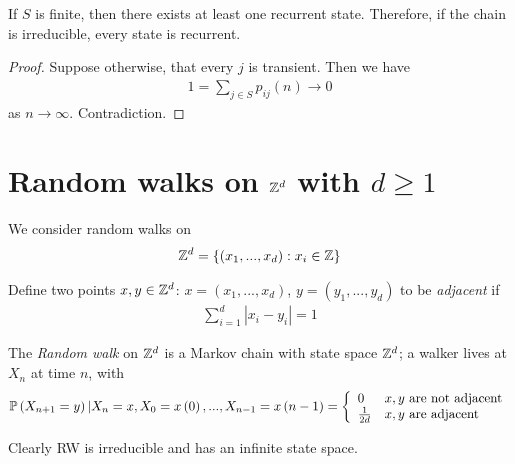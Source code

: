 \documentclass[a4paper]{article}
\begin{document}
\begin{thm}
If $S$ is finite, then there exists at least one recurrent state. Therefore, if the chain is irreducible, every state is recurrent.
\begin{proof}
Suppose otherwise, that every $j$ is transient. Then we have
\begin{equation*}
\begin{aligned}
1 = \sum_{j \in S} p_{ij}\left(n\right) \to 0
\end{aligned}
\end{equation*}
as $n \to \infty$. Contradiction.
\end{proof}
\end{thm}

\newpage

\section{Random walks on $\Z^d$ with $d \geq 1$}

We consider random walks on
\begin{equation*}
\begin{aligned}
\Z^d = \left\{\left(x_1,...,x_d\right):x_i \in \Z\right\}
\end{aligned}
\end{equation*}

Define two points $x,y\in\Z^d$: $x = \left(x_1,...,x_d\right)$, $y=\left(y_1,...,y_d\right)$ to be \emph{adjacent} if 
\begin{equation*}
\begin{aligned}
\sum_{i=1}^d \left|x_i-y_i\right| = 1
\end{aligned}
\end{equation*}

The \emph{Random walk} on $\Z^d$ is a Markov chain with state space $\Z^d$; a walker lives at $X_n$ at time $n$, with
\begin{equation*}
\begin{aligned}
\P\left(X_{n+1}=y\right) | X_n = x,X_0 = x\left(0\right),...,X_{n-1} = x\left(n-1\right) = \left\{ \begin{array}{ll} 0 & x,y \text{ are not adjacent}\\
\frac{1}{2d} & x,y \text{ are adjacent}
\end{array}
\right.
\end{aligned}
\end{equation*}

Clearly RW is irreducible and has an infinite state space.
\end{document}
